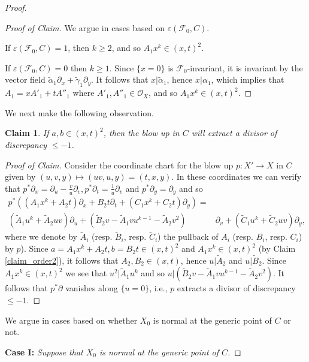 \documentclass[12pt, a4paper]{amsart}
\newtheorem{claim}[theorem]{Claim}
\theoremstyle{definition}
\theoremstyle{named}
\begin{document}
\begin{proof}
\begin{proof}[Proof of Claim]
We argue in cases based on $\varepsilon(\mathcal F_0, C)$.

If $\varepsilon(\mathcal F_0, C) = 1$, then $k \ge 2$, and so $A_1x^k \in (x, t)^2$.  

If $\varepsilon(\mathcal F_0, C) = 0$ then $k \ge 1$.   Since $\{x = 0\}$ is $\mathcal F_0$-invariant, it is invariant by the vector field 
$\tilde{\alpha}_1\partial_x+\tilde{\gamma}_1\partial_y$.  It follows that $x|\tilde{\alpha}_1$, hence $x|\alpha_1$, which implies that $A_1 = xA'_1+tA''_1$ where $A'_1, A''_1 \in \mathcal O_X$, and so $A_1x^k \in (x, t)^2$.
\end{proof}

We next make the following observation.

\begin{claim}
\label{claim_easy_discrep_calc}
    If
$a, b\in (x, t)^2$, 
then the blow up in $C$ will extract a divisor of discrepancy $\leq -1$.
\end{claim}
\begin{proof}[Proof of Claim]
Consider the coordinate chart for the blow up $p\colon X' \rightarrow X$ in $C$ 
given by $(u, v, y) \mapsto (uv, u, y) = (t, x, y)$.
In these coordinates we can verify that 
$p^*\partial_x = \partial_u - \frac{v}{u}\partial_v, p^*\partial_t = \frac{1}{u}\partial_v$ and $p^*\partial_y = \partial_y$ and so 
\begin{align*}p^*((A_1x^k+A_2t)\partial_x+B_2t\partial_t+(C_1x^k+C_2t)\partial_y) =& \\
(\tilde A_1u^k+\tilde A_2uv)\partial_u +(\tilde B_2v-\tilde A_1vu^{k-1}-\tilde A_2v^2)&\partial_v+(\tilde C_1u^k+\tilde C_2uv)\partial_y,
\end{align*}
where we denote by $\tilde{A}_i$ (resp. $\tilde{B}_i$, resp. $\tilde{C}_i$) the pullback of $A_i$ (resp. $B_i$, resp. $C_i$)
by $p$).
Since $a = A_1x^k+A_2t, b = B_2t \in (x, t)^2$ and $A_1x^k \in (x, t)^2$ (by Claim \ref{claim_order2}), it follows that
$A_2, B_2 \in (x, t)$, hence $u|\tilde A_2$ and 
$u|\tilde B_2$. Since $A_1x^k \in (x, t)^2$ we see that $u^2|\tilde A_1u^k$ and so $u| (\tilde B_2v-\tilde A_1vu^{k-1}-\tilde A_2v^2)$.  It follows that $p^*\partial$ vanishes along $\{u = 0\}$, i.e., $p$ extracts a divisor of discrepancy $\le-1$.
\end{proof}

We argue in cases based on whether $X_0$ is normal at the generic point of $C$ or not.

{\bf Case I: }{\it  Suppose that $X_0$ is normal at the generic point of $C$.}


\end{proof}
\end{document}
